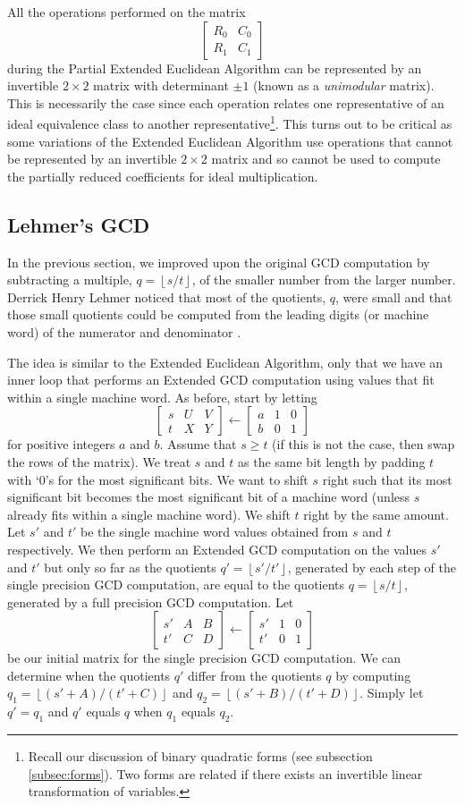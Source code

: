 \documentclass{ucalgthes1}
\theoremstyle{definition}
\newcommand{\matrixtt}[4]{\left[ \begin{array}{rr} #1 & #2 \\ #3 & #4 \end{array} \right]}
\newcommand{\matrixThreeTwo}[6]{\left[ \begin{array}{rrr} #1 & #2 & #3 \\ #4 & #5 & #6 \end{array} \right]}
\newcommand{\floor}[1]{\left\lfloor #1 \right\rfloor}
\begin{document}
All the operations performed on the matrix
\[
\matrixtt{R_0}{C_0}{R_1}{C_1}
\]
during the Partial Extended Euclidean Algorithm can be represented by an invertible $2 \times 2$ matrix with determinant $\pm 1$ (known as a \emph{unimodular} matrix).  This is necessarily the case since each operation relates one representative of an ideal equivalence class to another representative\footnote{Recall our discussion of binary quadratic forms (see subsection \ref{subsec:forms}). Two forms are related if there exists an invertible linear transformation of variables.}. This turns out to be critical as some variations of the Extended Euclidean Algorithm use operations that cannot be represented by an invertible $2 \times 2$ matrix and so cannot be used to compute the partially reduced coefficients for ideal multiplication.

\subsection{Lehmer's GCD}

In the previous section, we improved upon the original GCD computation by subtracting a multiple, $q = \floor{s / t}$, of the smaller number from the larger number.  Derrick Henry Lehmer noticed that most of the quotients, $q$, were small and that those small quotients could be computed from the leading digits (or machine word) of the numerator and denominator \cite{Lehmer1938}.

The idea is similar to the Extended Euclidean Algorithm, only that we have an inner loop that performs an Extended GCD computation using values that fit within a single machine word.  As before, start by letting
\[
	\matrixThreeTwo{s}{U}{V}{t}{X}{Y} \gets \matrixThreeTwo{a}{1}{0}{b}{0}{1}
\]
for positive integers $a$ and $b$.  Assume that $s \ge t$ (if this is not the case, then swap the rows of the matrix).  We treat $s$ and $t$ as the same bit length by padding $t$ with `0's for the most significant bits.  We want to shift $s$ right such that its most significant bit becomes the most significant bit of a machine word (unless $s$ already fits within a single machine word).  We shift $t$ right by the same amount. Let $s'$ and $t'$ be the single machine word values obtained from $s$ and $t$ respectively.  We then perform an Extended GCD computation on the values $s'$ and $t'$ but only so far as the quotients $q'=\floor{s'/t'}$, generated by each step of the single precision GCD computation, are equal to the quotients $q=\floor{s/t}$, generated by a full precision GCD computation.  Let
\[
\matrixThreeTwo{s'}{A}{B}{t'}{C}{D} \gets \matrixThreeTwo{s'}{1}{0}{t'}{0}{1}
\]
be our initial matrix for the single precision GCD computation.  We can determine when the quotients $q'$ differ from the quotients $q$ by computing $q_1 = \floor{(s'+A)/(t'+C)}$ and $q_2 = \floor{(s'+B)/(t'+D)}$.  Simply let $q' = q_1$ and $q'$ equals $q$ when $q_1$ equals $q_2$.
\end{document}
